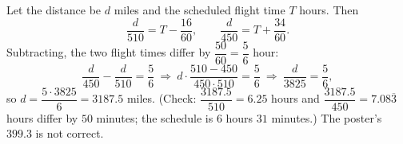 Let the distance be $d$ miles and the scheduled flight time $T$ hours. Then
\[
\dfrac{d}{510}=T-\dfrac{16}{60},\qquad \dfrac{d}{450}=T+\dfrac{34}{60}.
\]
Subtracting, the two flight times differ by $\dfrac{50}{60}=\dfrac{5}{6}$ hour:
\[
\dfrac {d}{450}-\dfrac {d}{510}=\dfrac{5}{6}\ \Longrightarrow\ d\cdot\dfrac{510-450}{450\cdot510}=\dfrac{5}{6}\ \Longrightarrow\ \dfrac{d}{3825}=\dfrac{5}{6},
\]
so $d=\dfrac{5\cdot3825}{6}=\boxed{3187.5}$ miles. (Check: $\dfrac{3187.5}{510}=6.25$ hours and $\dfrac{3187.5}{450}=7.08\overline{3}$ hours differ by $50$ minutes; the schedule is $6$ hours $31$ minutes.) The poster's $399.3$ is not correct.
